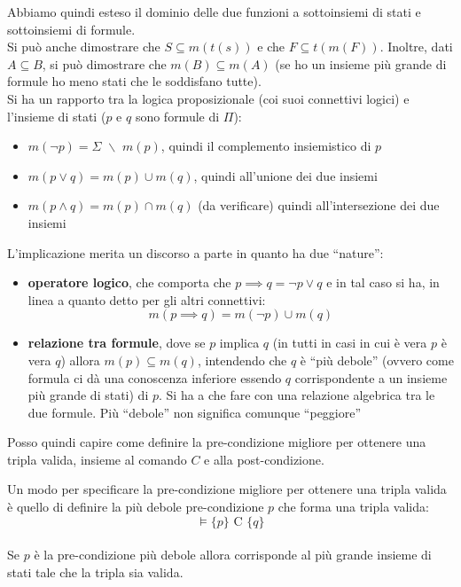 				      				Abbiamo quindi esteso il dominio delle due funzioni a sottoinsiemi di stati e
				      				sottoinsiemi di formule.\\
				      				Si può anche dimostrare che $S\subseteq m(t(s))$ e che $F\subseteq
				      				t(m(F))$. Inoltre, dati $A\subseteq B$, si può dimostrare che $m(B)\subseteq
				      				m(A)$ (se ho un insieme più grande di formule ho meno stati che le soddisfano
				      				tutte).\\
				      				Si ha un rapporto tra la logica proposizionale (coi suoi connettivi logici) e
				      				l'insieme di stati ($p$ e $q$ sono formule di $\Pi$): 
				      				\begin{itemize}
				      					\item $m(\neg p)=\Sigma \,\,\backslash \,\,m(p)$, quindi il complemento
				      					      insiemistico di $p$
				      					\item $m(p\lor q)=m(p)\cup m(q)$, quindi all'unione dei due insiemi  
				      					\item $m(p\land q)=m(p)\cap m(q)$ (da verificare) quindi all'intersezione dei
				      					      due insiemi
				      				\end{itemize}
				      				L'implicazione merita un discorso a parte in quanto ha due ``nature'':
				      				\begin{itemize}
				      					\item \textbf{operatore logico}, che comporta che $p\implies q= \neg p\lor q$
				      					      e in tal caso si ha, in linea a quanto detto per gli altri connettivi:
				      					      \[m(p\implies q)= m(\neg p)\cup m(q)\]
				      					\item \textbf{relazione tra formule}, dove se $p$ implica $q$ (in tutti in
				      					      casi in cui è vera $p$ è vera $q$) allora
				      					      $m(p)\subseteq m(q)$, intendendo che $q$ è ``più debole'' (ovvero come formula
				      					      ci dà una conoscenza inferiore essendo $q$ corrispondente a un insieme più
				      					      grande di stati) di $p$. Si ha a che
				      					      fare con una relazione algebrica tra le due formule. Più ``debole'' non
				      					      significa comunque ``peggiore''
				      				\end{itemize}
				      				Posso quindi capire come definire la pre-condizione migliore per ottenere una
				      				tripla valida, insieme al comando $C$ e alla post-condizione.\\
				      			    \begin{definizione}
				      			        Un modo per specificare la pre-condizione migliore per ottenere una
				      				tripla valida è quello di definire la più
				      				debole pre-condizione $p$ che forma una tripla valida:
				      				\[\vDash \{p\}\mbox{ C }\{q\}\] \\
				      				Se $p$ è la pre-condizione più debole allora corrisponde al più grande insieme di
				      				stati tale che la tripla sia valida.
				      			    \end{definizione}
